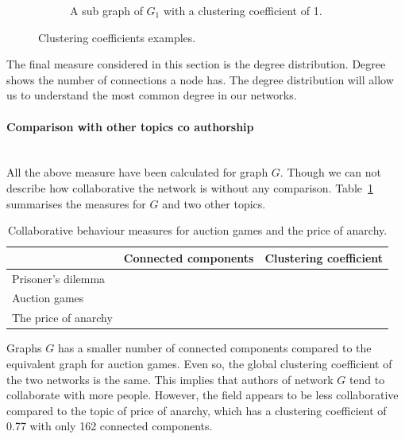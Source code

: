 \documentclass{article}
\newcommand{\prisonerscon}{}
\newcommand{\prisonerscc}{}
\newcommand{\pricecon}{}
\newcommand{\pricecc}{}
\newcommand{\auctioncon}{}
\newcommand{\auctioncc}{}
\begin{document}
\begin{center}
\begin{figure}[!hbtp]
\begin{subfigure}{0.33\textwidth}
            \caption{A sub graph of \(G_1\) with a clustering coefficient of 1.}
        \end{subfigure}
    \caption{Clustering coefficients examples.}
    \label{fig:clustering_coefficients}
    \end{figure}
    \end{center}

The final measure considered in this section is the degree distribution. Degree
shows the number of connections a node has. The degree distribution will allow
us to understand the most common degree in our networks.

\paragraph{Comparison with other topics co authorship}
\mbox{ }\\

All the above measure have been calculated for graph \(G\). Though we can not describe
how collaborative the network is without any comparison. Table~\ref{table:other_topics_cc}
summarises the measures for \(G\) and two other topics.

\begin{table}[!hbtp]
    \begin{center}
    \begin{tabular}{lcc}
        \toprule
                             & \textbf{Connected components} & \textbf{Clustering coefficient}\\
        \midrule
        Prisoner's dilemma   &                 \prisonerscon & \prisonerscc \\
        Auction games        &                   \auctioncon & \auctioncc   \\
        The price of anarchy &                     \pricecon & \pricecc     \\
        \bottomrule
    \end{tabular}
    \end{center}
    \caption{Collaborative behaviour measures for auction games and the price of anarchy.}
    \label{table:other_topics_cc}
\end{table}

Graphs \(G\) has a smaller number of connected components compared to the equivalent
graph for auction games. Even so, the global clustering coefficient of the two
networks is the same. This implies that authors of network \(G\) tend to collaborate
with more people. However, the field appears to be less collaborative compared
to the topic of price of anarchy, which has a clustering coefficient of 0.77 with
only 162 connected components.
\end{document}
